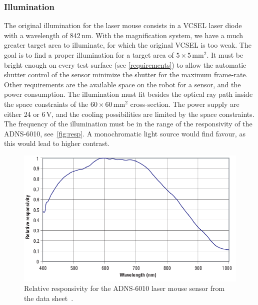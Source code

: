 \documentclass[12pt,a4paper]{article}
\begin{document}
\subsubsection{Illumination}

The original illumination for the laser mouse consists in a VCSEL laser diode with a wavelength of 842\,nm.
With the magnification system, we have a much greater target area to illuminate, for which the original VCSEL is too weak.
The goal is to find a proper illumination for a target area of $5\times5$\,mm$^2$.
It must be bright enough on every test surface (see \autoref{requirements}) %
to allow the automatic shutter control of the sensor minimize the shutter for the maximum frame-rate. 
Other requirements are the available space on the robot for a sensor, and the power consumption. 
The illumination must fit besides the optical ray path inside the space constraints of the $60\times60$\,mm$^2$ cross-section.
The power supply are either 24 or 6\,V, and the cooling possibilities are limited by the space constraints.\\
The frequency of the illumination must be in the range of the responsivity of the ADNS-6010, see~\autoref{fig:resp}.
A monochromatic light source would find favour, as this would lead to higher contrast.

\begin{figure}[htbp]
\begin{center}
\includegraphics[width=0.6\columnwidth]{figures/responsivity}
\caption{\label{fig:resp}
Relative responsivity for the ADNS-6010 laser mouse sensor from the data sheet~\cite{adns}.
}
\end{center}
\end{figure}
\end{document}
